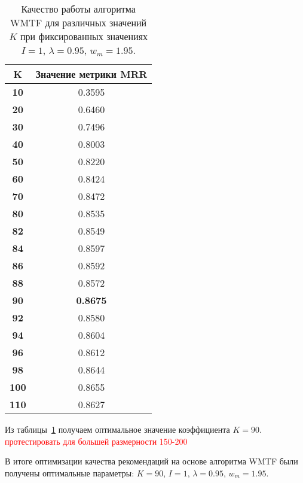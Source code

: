     \begin{table}[ht!]
        \caption{Качество работы алгоритма WMTF для различных значений $K$ при фиксированных значениях $I=1$, $\lambda=0.95$, $w_m=1.95$. \bigskip}
        \centering

        \label{tabular:wtmf_test4}
        \begin{tabular}{|c|c|} \hline
            \bf{K}  & \bf{Значение метрики MRR} \\ \hline
            \bf{10} & 0.3595 \\ \hline
            \bf{20} & 0.6460 \\ \hline
            \bf{30} & 0.7496 \\ \hline
            \bf{40} & 0.8003 \\ \hline
            \bf{50} & 0.8220 \\ \hline
            \bf{60} & 0.8424 \\ \hline
            \bf{70} & 0.8472 \\ \hline
            \bf{80} & 0.8535 \\ \hline
            \bf{82} & 0.8549 \\ \hline
            \bf{84} & 0.8597 \\ \hline
            \bf{86} & 0.8592 \\ \hline
            \bf{88} & 0.8572 \\ \hline
            \bf{90} & \bf{0.8675} \\ \hline
            \bf{92} & 0.8580 \\ \hline
            \bf{94} & 0.8604 \\ \hline
            \bf{96} & 0.8612 \\ \hline
            \bf{98} & 0.8644 \\ \hline
            \bf{100} & 0.8655 \\ \hline
            \bf{110} & 0.8627 \\ \hline
        \end{tabular}
    \end{table}
    Из таблицы~\ref{tabular:wtmf_test4} получаем оптимальное значение коэффициента $K=90$. \textcolor{red}{протестировать для большей размерности 150-200}

    В итоге оптимизации качества рекомендаций на основе алгоритма WMTF были получены оптимальные параметры:
    $K=90$, $I=1$, $\lambda=0.95$, $w_m=1.95$.

